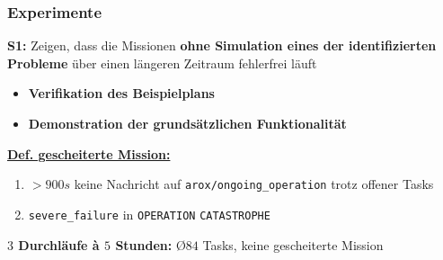 \documentclass{beamer}
\newcommand{\code}[1]{\colorbox{light-gray}{\texttt{#1}}}
\begin{document}
\begin{frame}
  \frametitle{Experimente}
  \textbf{S1:} Zeigen, dass die Missionen \textbf{ohne Simulation eines der identifizierten Probleme} über einen längeren Zeitraum fehlerfrei läuft
  \begin{itemize}
    \item \textbf{Verifikation des Beispielplans}
    \item \textbf{Demonstration der grundsätzlichen Funktionalität}
  \end{itemize}
  \underline{\textbf{Def. gescheiterte Mission:}}
  \begin{enumerate}
    \item $> 900s$ keine Nachricht auf \code{arox/ongoing\_operation} trotz offener Tasks
    \item \code{severe\_failure} in \code{OPERATION} \textrightarrow \thinspace \code{CATASTROPHE}
  \end{enumerate}
  \textbf{$3$ Durchläufe à $5$ Stunden:}\newline
  \textrightarrow \thinspace \O $84$ Tasks, keine gescheiterte Mission
\end{frame}
\end{document}
